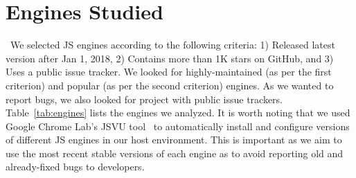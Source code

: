 \documentclass[sigconf,review, anonymous]{acmart}
\begin{document}





\section{Engines Studied}
\label{sec:methodology}
\label{sec:methodology:engines}~We selected 
JS engines according to the following criteria: 1) Released latest
version after Jan 1, 2018, 2) Contains more than 1K stars on GitHub,
and 3) Uses a public issue tracker. We looked for highly-maintained
(as per the first criterion) and popular (as per the second criterion)
engines. As we wanted to report bugs, we also looked for project with
public issue trackers. Table~\ref{tab:engines} lists the engines we
analyzed. It is worth noting that we used Google Chrome Lab's JSVU
tool~\cite{jsvu} to automatically install and configure versions of
different JS engines in our host environment. This is important as we
aim to use the most recent stable versions of each engine as to avoid
reporting old and already-fixed bugs to developers.

\end{document}
